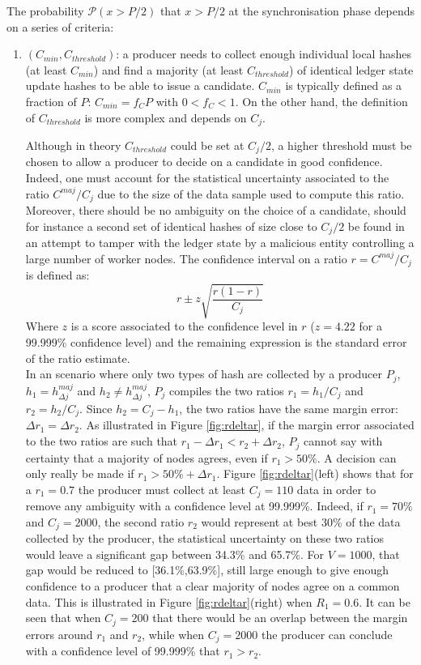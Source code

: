 The probability $\mathcal{P}(x>P/2)$ that $x >P/2$ at the synchronisation phase depends on a series of criteria:
\begin{enumerate}
\item $(C_{min}, C_{threshold})$: a producer needs to collect enough individual local hashes (at least $C_{min}$) and find a majority (at least $C_{threshold}$) of identical ledger state update hashes to be able to issue a candidate. 
$C_{min}$ is typically defined as a fraction of $P$: $C_{min} = f_C P$ with $0 < f_C < 1$. On the other hand, the definition of $C_{threshold}$ is more complex and depends on $C_j$. 

 Although in theory $C_{threshold}$ could be set at $C_j/2$, a higher threshold must be chosen to allow a producer to decide on a candidate in good confidence. Indeed, one must account for the statistical uncertainty associated to the ratio $C^{maj}/C_j$ due to the size of the data sample used to compute this ratio. Moreover, there should be no ambiguity on the choice of a candidate, should for instance a second set of identical hashes of size close to $C_j/2$ be found in an attempt to tamper with the ledger state by a malicious entity controlling a large number of worker nodes. The confidence interval on a ratio $r=C^{maj}/C_j$ is defined as:
 \begin{equation}
 r \pm z\sqrt{\frac{r(1-r)}{C_j}}
 \end{equation}
 Where $z$ is a score associated to the confidence level in $r$ ($z=4.22$ for a 99.999\% confidence level) and the remaining expression is the standard error of the ratio estimate. \\
 
 In an scenario where only two types of hash are collected by a producer $P_j$, $h_1 =h^{maj}_{\Delta j}$ and $h_2 \neq h^{maj}_{\Delta j}$, $P_j$ compiles the two ratios $r_1 = h_1/C_j$ and $r_2 = h_2 /C_j$. Since $h_2 = C_j - h_1$, the two ratios have the same margin error: $\Delta r_1 = \Delta r_2$. As illustrated in Figure \ref{fig:rdeltar}, if the margin error associated to the two ratios are such that $r_1 - \Delta r_1 < r_2 + \Delta r_2$, $P_j$ cannot say with certainty that a majority of nodes agrees, even if $r_1 > 50\%$. A decision can only really be made if $r_1 > 50\% + \Delta r_1$. Figure \ref{fig:rdeltar}(left) shows that for a $r_{1} = 0.7$ the producer must collect at least $C_j=110$ data in order to remove any ambiguity with a confidence level at 99.999\%. Indeed, if $r_1 = 70\%$ and $C_j=2000$, the second ratio $r_2$ would represent at best 30\% of the data collected by the producer, the statistical uncertainty on these two ratios would leave a significant gap between 34.3\% and 65.7\%. For $V= 1000$, that gap would be reduced to [36.1\%,63.9\%], still large enough to give enough confidence to a producer that a clear majority of nodes agree on a common data. This is illustrated in Figure \ref{fig:rdeltar}(right) when $R_1 = 0.6$. It can be seen that when $C_j = 200$ that there would be an overlap between the margin errors around $r_1$ and $r_2$, while when $C_j = 2000$ the producer can conclude with a confidence level of 99.999\% that $r_1 > r_2$.\\


\end{enumerate}
